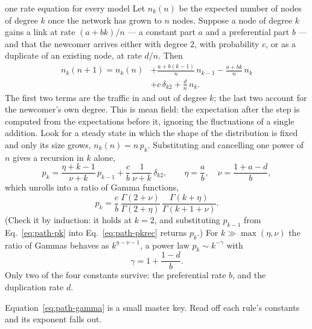 \begin{calculation}{one rate equation for every model}
Let $n_k(n)$ be the expected number of nodes of degree $k$ once the network has
grown to $n$ nodes. Suppose a node of degree $k$ gains a link at rate
$(a+bk)/n$ --- a constant part $a$ and a preferential part $b$ --- and that the
newcomer arrives either with degree $2$, with probability $c$, or as a duplicate of
an existing node, at rate $d/n$. Then
\begin{equation}
\begin{split}
  n_k(n+1) = n_k(n) &+ \frac{a+b(k-1)}{n}\,n_{k-1} - \frac{a+bk}{n}\,n_k \\
  &+ c\,\delta_{k2} + \frac{d}{n}\,n_k .
\end{split}
\label{eq:path-rate}
\end{equation}
The first two terms are the traffic in and out of degree $k$; the last two account
for the newcomer's own degree. This is mean field: the expectation after the step
is computed from the expectations before it, ignoring the fluctuations of a single
addition. Look for a steady state in which the shape of the distribution is fixed
and only its size grows, $n_k(n)=n\,p_k$. Substituting and cancelling one power of
$n$ gives a recursion in $k$ alone,
\begin{equation}
  p_k = \frac{\eta+k-1}{\nu+k}\,p_{k-1}
  + \frac{c}{b}\,\frac{1}{\nu+k}\,\delta_{k2},
  \qquad
  \eta = \frac{a}{b},
  \quad
  \nu = \frac{1+a-d}{b},
  \label{eq:path-pkrec}
\end{equation}
which unrolls into a ratio of Gamma functions,
\begin{equation}
  p_k = \frac{c}{b}\,\frac{\Gamma(2+\nu)}{\Gamma(2+\eta)}\,
  \frac{\Gamma(k+\eta)}{\Gamma(k+1+\nu)} .
  \label{eq:path-pk}
\end{equation}
(Check it by induction: it holds at $k=2$, and substituting $p_{k-1}$ from
Eq.~\eqref{eq:path-pk} into Eq.~\eqref{eq:path-pkrec} returns $p_k$.) For
$k\gg\max(\eta,\nu)$ the ratio of Gammas behaves as $k^{\eta-\nu-1}$, a power law
$p_k\sim k^{-\gamma}$ with
\begin{equation}
  \gamma = 1 + \frac{1-d}{b} .
  \label{eq:path-gamma}
\end{equation}
Only two of the four constants survive: the preferential rate $b$, and the
duplication rate $d$.
\end{calculation}

Equation~\eqref{eq:path-gamma} is a small master key. Read off each rule's
constants and its exponent falls out.

